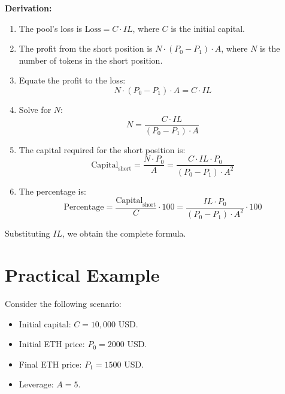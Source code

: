 \documentclass[11pt]{article}
\begin{document}
\textbf{Derivation:}
\begin{enumerate}
    \item The pool's loss is \(\text{Loss} = C \cdot IL\), where \(C\) is the initial capital.
    \item The profit from the short position is \(N \cdot (P_0 - P_1) \cdot A\), where \(N\) is the number of tokens in the short position.
    \item Equate the profit to the loss:
    \begin{equation}
    N \cdot (P_0 - P_1) \cdot A = C \cdot IL
    \end{equation}
    \item Solve for \(N\):
    \begin{equation}
    N = \frac{C \cdot IL}{(P_0 - P_1) \cdot A}
    \end{equation}
    \item The capital required for the short position is:
    \begin{equation}
    \text{Capital}_{\text{short}} = \frac{N \cdot P_0}{A} = \frac{C \cdot IL \cdot P_0}{(P_0 - P_1) \cdot A^2}
    \end{equation}
    \item The percentage is:
    \begin{equation}
    \text{Percentage} = \frac{\text{Capital}_{\text{short}}}{C} \cdot 100 = \frac{IL \cdot P_0}{(P_0 - P_1) \cdot A^2} \cdot 100
    \end{equation}
\end{enumerate}
Substituting \(IL\), we obtain the complete formula.

\section{Practical Example}
Consider the following scenario:
\begin{itemize}
    \item Initial capital: \(C = 10,000\) USD.
    \item Initial ETH price: \(P_0 = 2000\) USD.
    \item Final ETH price: \(P_1 = 1500\) USD.
    \item Leverage: \(A = 5\).
\end{itemize}
\end{document}
